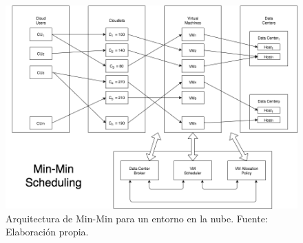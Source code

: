 \begin{figure}
	\caption{Arquitectura de Min-Min para un entorno en la nube. Fuente: Elaboración propia.}
	\centering
	\includegraphics[scale=0.5]{media/imagencinco}
\end{figure}
